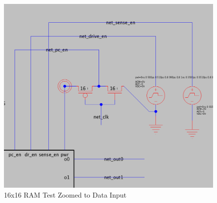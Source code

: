 \documentclass[a4paper]{article}
\begin{document}
\begin{figure}[H]
	\centering
	\includegraphics[scale=0.35]{memory16x16TestSchematicControl}
	\caption{16x16 RAM Test Zoomed to Data Input}
	\label{fig:memory16x16TestSchematicControl}
\end{figure}
\end{document}
